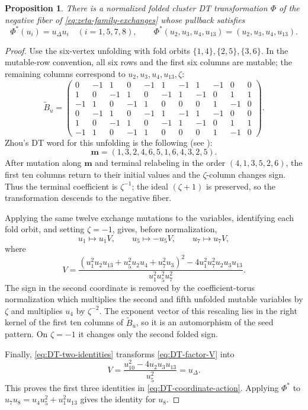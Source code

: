 \documentclass[11pt,reqno]{amsart}
\numberwithin{equation}{section}
\newtheorem{proposition}[proposition]{Proposition}
\theoremstyle{remark}
\newcommand{\udisc}{u_{\Delta}}
\begin{document}
\begin{proposition}\label{prop:DT-coordinate-action}
There is a normalized folded cluster DT transformation $\Phi$ of the
negative fiber of \eqref{eq:zeta-family-exchanges} whose pullback satisfies
\begin{equation}
\label{eq:DT-coordinate-action}
 \Phi^*(u_i)=\udisc u_i\quad(i=1,5,7,8),
 \qquad
 \Phi^*(u_2,u_3,u_4,u_{13})=(u_2,u_3,u_4,u_{13}).
\end{equation}
\end{proposition}

\begin{proof}
Use the six-vertex unfolding with fold orbits
$\{1,4\},\{2,5\},\{3,6\}$.  In the mutable-row convention, all six rows
and the first six columns are mutable; the remaining columns correspond to
$u_2,u_3,u_4,u_{13},\zeta$:
\[
 \widetilde B_u=
 \begin{pmatrix}
 0&-1& 1& 0&-1& 1&-1& 1&-1& 0&0\\
 1& 0&-1& 1& 0&-1& 1&-1& 0& 1&1\\
 -1&1& 0&-1& 1& 0& 0& 0& 1&-1&0\\
 0&-1& 1& 0&-1& 1&-1& 1&-1& 0&0\\
 1& 0&-1& 1& 0&-1& 1&-1& 0& 1&1\\
 -1&1& 0&-1& 1& 0& 0& 0& 1&-1&0
 \end{pmatrix}.
\]
Zhou's DT word for this unfolding is the following (see \cite[Section~5.1]{Zhou}):
\[ \mathbf m=(1,3,2,4,6,5,1,6,4,3,2,5). \]
After mutation along $\mathbf m$ and terminal
relabeling in the order $(4,1,3,5,2,6)$, the first ten columns return to
their initial values and the $\zeta$-column changes sign.  Thus the terminal
coefficient is $\zeta^{-1}$; the ideal $(\zeta+1)$ is preserved, so the
transformation descends to the negative fiber.

Applying the same twelve exchange mutations to the variables, identifying
each fold orbit, and setting $\zeta=-1$, gives, before normalization,
\[ u_1\longmapsto u_1V, \qquad u_5\longmapsto-u_5V, \qquad u_7\longmapsto u_7V, \]
where
\begin{equation}
\label{eq:DT-factor-V}
 V=
 \frac{
 (u_1^2u_2u_{13}+u_5^2u_2u_4+u_7^2u_3)^2
 -4u_1^2u_7^2u_2u_3u_{13}}
 {u_1^2u_5^2u_7^2}.
\end{equation}
The sign in the second coordinate is removed by the coefficient-torus
normalization which multiplies the second and fifth unfolded mutable
variables by $\zeta$ and multiplies $u_4$ by $\zeta^{-2}$.  The
exponent vector of this rescaling lies in the right kernel of the first ten
columns of $\widetilde B_u$, so it is an automorphism of the seed pattern.
On $\zeta=-1$ it changes only the second folded sign.

Finally, \eqref{eq:DT-two-identities} transforms \eqref{eq:DT-factor-V} into
\[ V=\frac{u_{10}^2-4u_2u_3u_{13}}{u_5^2}=\udisc. \]
This proves the first three identities in \eqref{eq:DT-coordinate-action}.
Applying $\Phi^*$ to
$u_7u_8=u_4u_5^2+u_1^2u_{13}$ gives the identity for $u_8$.
\end{proof}
\end{document}
